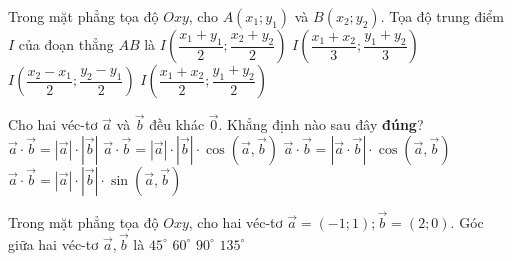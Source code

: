 \begin{ex}%
Trong mặt phẳng tọa độ $O x y$, cho $A\left(x_1 ; y_1\right)$ và $B\left(x_2 ; y_2\right)$. Tọa độ trung điểm $I$ của đoạn thẳng $A B$ là
	\choice
	{$I\left(\dfrac{x_1+y_1}{2}; \dfrac{x_2+y_2}{2}\right)$}
	{$I\left(\dfrac{x_1+x_2}{3}; \dfrac{y_1+y_2}{3}\right)$}
	{$I\left(\dfrac{x_2-x_1}{2}; \dfrac{y_2-y_1}{2}\right)$}
	{\True $I\left(\dfrac{x_1+x_2}{2}; \dfrac{y_1+y_2}{2}\right)$}	
\end{ex}

\begin{ex}%
Cho hai véc-tơ $\overrightarrow{a}$ và $\overrightarrow{b}$ đều khác $\overrightarrow{0}$. Khẳng định nào sau đây \textbf{đúng}?
	\choice
	{$\overrightarrow{a} \cdot \overrightarrow{b}=|\overrightarrow{a}| \cdot|\overrightarrow{b}|$}
	{\True $\overrightarrow{a} \cdot \overrightarrow{b}=|\overrightarrow{a}| \cdot|\overrightarrow{b}| \cdot \cos (\overrightarrow{a}, \overrightarrow{b})$}
	{$\overrightarrow{a} \cdot \overrightarrow{b}=|\vec{a} \cdot \overrightarrow{b}| \cdot \cos (\overrightarrow{a}, \overrightarrow{b})$}
	{$\overrightarrow{a} \cdot \overrightarrow{b}=|\overrightarrow{a}| \cdot|\overrightarrow{b}| \cdot \sin (\overrightarrow{a}, \overrightarrow{b})$}	
\end{ex}

\begin{ex}%
Trong mặt phẳng tọa độ $Oxy$, cho hai véc-tơ $\overrightarrow{a}=(-1; 1); \overrightarrow{b}=(2; 0)$. Góc giữa hai véc-tơ $\overrightarrow{a}, \overrightarrow{b}$ là
	\choice
	{$45^{\circ}$}
	{$60^{\circ}$}
	{$90^{\circ}$}
	{\True $135^{\circ}$}	
\end{ex}




